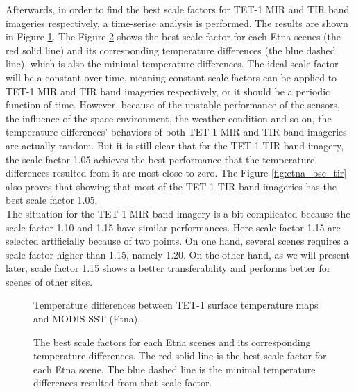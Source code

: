 \noindent Afterwards, in order to find the best scale factors for TET-1 MIR and TIR band imageries respectively, a time-serise analysis is performed. The results are shown in Figure \ref{fig:etna_sc_mir_tir}. The Figure \ref{fig:etna_bsc_tem} shows the best scale factor for each Etna scenes (the red solid line) and its corresponding temperature differences (the blue dashed line), which is also the minimal temperature differences. The ideal scale factor will be a constant over time, meaning constant scale factors can be applied to TET-1 MIR and TIR band imageries respectively, or it should be a periodic function of time. However, because of the unstable performance of the sensors, the influence of the space environment, the weather condition and so on, the temperature differences' behaviors of both TET-1 MIR and TIR band imageries are actually random. But it is still clear that for the TET-1 TIR band imagery, the scale factor 1.05 achieves the best performance that the temperature differences resulted from it are most close to zero. The Figure \ref{fig:etna_bsc_tir} also proves that showing that most of the TET-1 TIR band imageries has the best scale factor 1.05.\\

\noindent The situation for the TET-1 MIR band imagery is a bit complicated because the scale factor 1.10 and 1.15 have similar performances. Here scale factor 1.15 are selected artificially because of two points. On one hand, several scenes requires a scale factor higher than 1.15, namely 1.20. On the other hand, as we will present later, scale factor 1.15 shows a better transferability and performs better for scenes of other sites.\\

\begin{figure}[!htbp]
\centering
{}
\hspace{0.5in}
\caption{Temperature differences between TET-1 surface temperature maps and MODIS SST (Etna).}
\label{fig:etna_sc_mir_tir}
\end{figure}

\begin{figure}[!htbp]
\centering
{}
\hspace{0.5in}
\caption{The best scale factors for each Etna scenes and its corresponding temperature differences. The red solid line is the best scale factor for each Etna scene. The blue dashed line is the minimal temperature differences resulted from that scale factor.}
\label{fig:etna_bsc_tem}
\end{figure}

